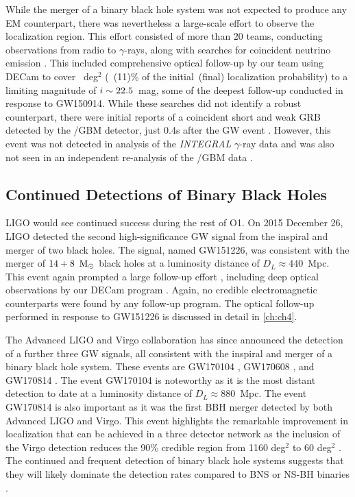 While the merger of a binary black hole system was not expected to produce any EM counterpart, there was nevertheless a large-scale effort to observe the localization region. This effort consisted of more than 20 teams, conducting observations from radio to $\gamma$-rays, along with searches for coincident neutrino emission \citep{LIGOGW150914FollowUp,LIGOGW150914FollowUpSupp,GW150914IceCube,Annis+16,GW150914Fermi,Evans+16,Kasliwal+16,Savchenko+16,GW150914PS1,GW150914DECam,Tavani+16}. This included comprehensive optical follow-up by our team using DECam to cover ~deg$^2$ (~(11)\% of the initial~(final) localization probability) to a limiting magnitude of $i \sim 22.5$~mag, some of the deepest follow-up conducted in response to GW150914. While these searches did not identify a robust counterpart, there were initial reports of a coincident short and weak GRB detected by the \fermi/GBM detector, just 0.4s after the GW event \citep{GW150914Fermi}. However, this event was not detected in analysis of the {\it INTEGRAL} $\gamma$-ray data \citep{Savchenko+16} and was also not seen in an independent re-analysis of the \fermi/GBM data \citep{Greiner+16}.

\subsection{Continued Detections of Binary Black Holes}
\label{sec:intro_bbhs}
LIGO would see continued success during the rest of O1. On 2015 December 26, LIGO detected the second high-significance GW signal from the inspiral and merger of two black holes. The signal, named GW151226, was consistent with the merger of $14+8~{\rm\,M_\odot}$ black holes at a luminosity distance of $D_L \approx 440$~Mpc. This event again prompted a large follow-up effort \citep[see e.g.,][]{GW150914PS1,Yoshida+17}, including deep optical observations by our DECam program \citep{Cowp+16}. Again, no credible electromagnetic counterparts were found by any follow-up program. The optical follow-up performed in response to GW151226 is discussed in detail in \cref{ch:ch4}.

The Advanced LIGO and Virgo collaboration has since announced the detection of a further three GW signals, all consistent with the inspiral and merger of a binary black hole system. These events are GW170104 \citep{LIGOGW170104}, GW170608 \citep{LIGOGW170608}, and GW170814 \citep{LIGOGW170814}. The event GW170104 is noteworthy as it is the most distant detection to date at a luminosity distance of $D_L \approx 880$~Mpc. The event GW170814 is also important as it was the first BBH merger detected by both Advanced LIGO and Virgo. This event highlights the remarkable improvement in localization that can be achieved in a three detector network as the inclusion of the Virgo detection reduces the 90\% credible region from 1160 deg$^2$ to 60 deg$^2$ \citep{LIGOGW170814}. The continued and frequent detection of binary black hole systems suggests that they will likely dominate the detection rates compared to BNS or NS-BH binaries \citep{LIGOBBHRates}.

